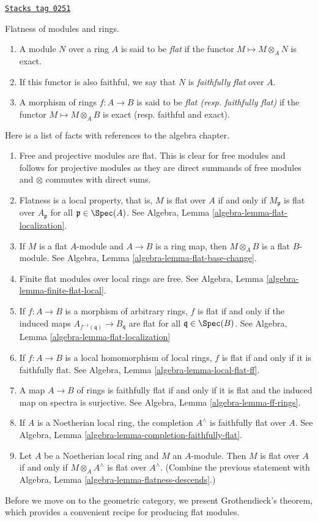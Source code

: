 \begin{definition}
\label{etale-definition-flat-rings}
\href{https://stacks.math.columbia.edu/tag/0251}{\texttt{Stacks tag 0251}}

Flatness of modules and rings.
\begin{enumerate}
\item A module $N$ over a ring $A$ is said to be {\it flat}
if the functor $M \mapsto M \otimes_A N$ is exact.
\item If this functor is also faithful, we say that
$N$ is {\it faithfully flat} over $A$.
\item A morphism of rings $f : A \to B$ is said to be
{\it flat (resp. faithfully flat)}
if the functor $M \mapsto M \otimes_A B$ is exact
(resp. faithful and exact).
\end{enumerate}
\end{definition}

Here is a list of facts with references to the algebra chapter.
\begin{enumerate}
\item Free and projective modules are flat. This is clear for free modules
and follows for projective modules as they are direct summands of free
modules and $\otimes$ commutes with direct sums.
\item Flatness is a local property, that is, $M$ is flat over $A$
if and only if $M_{\mathfrak p}$ is flat over $A_{\mathfrak p}$ for all
$\mathfrak p \in \Spec(A)$.
See Algebra, Lemma \ref{algebra-lemma-flat-localization}.
\item If $M$ is a flat $A$-module and $A \to B$ is a ring map,
then $M \otimes_A B$ is a flat $B$-module. See
Algebra, Lemma \ref{algebra-lemma-flat-base-change}.
\item Finite flat modules over local rings are free.
See Algebra, Lemma \ref{algebra-lemma-finite-flat-local}.
\item If $f : A \to B$ is a morphism of arbitrary rings,
$f$ is flat if and only if the induced maps
$A_{f^{-1}(\mathfrak q)} \to B_{\mathfrak q}$ are flat for all
$\mathfrak q \in \Spec(B)$.
See Algebra, Lemma \ref{algebra-lemma-flat-localization}
\item If $f : A \to B$ is a local homomorphism of local rings,
$f$ is flat if and only if it is faithfully flat.
See Algebra, Lemma \ref{algebra-lemma-local-flat-ff}.
\item A map $A \to B$ of rings is faithfully flat if and only if it is
flat and the induced map on spectra is surjective.
See Algebra, Lemma \ref{algebra-lemma-ff-rings}.
\item If $A$ is a Noetherian local ring, the completion
$A^\wedge$ is faithfully flat over $A$.
See Algebra, Lemma \ref{algebra-lemma-completion-faithfully-flat}.
\item Let $A$ be a Noetherian local ring and $M$ an $A$-module.
Then $M$ is flat over $A$ if and only if $M \otimes_A A^\wedge$
is flat over $A^\wedge$. (Combine the previous statement with
Algebra, Lemma \ref{algebra-lemma-flatness-descends}.)
\end{enumerate}
Before we move on to the geometric category, we present Grothendieck's
theorem, which provides a convenient recipe for producing flat
modules.

